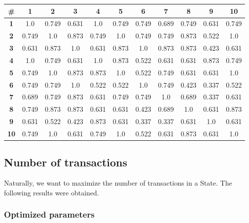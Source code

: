 \begin{table}[H]
\centering
\begin{tabular}{|c|c|c|c|c|c|c|c|c|c|c|}
    \hline
    \textbf{\#}& \textbf{1}& \textbf{2}& \textbf{3}& \textbf{4}& \textbf{5}& \textbf{6}& \textbf{7}& \textbf{8}& \textbf{9}& \textbf{10}\\ \hline
    \textbf{1}  & 1.0 & 0.749 & 0.631 & 1.0 & 0.749 & 0.749 & 0.689 & 0.749 & 0.631 & 0.749\\ \hline
    \textbf{2}  & 0.749 & 1.0 & 0.873 & 0.749 & 1.0 & 0.749 & 0.749 & 0.873 & 0.522 & 1.0\\ \hline
    \textbf{3}  & 0.631 & 0.873 & 1.0 & 0.631 & 0.873 & 1.0 & 0.873 & 0.873 & 0.423 & 0.631\\ \hline
    \textbf{4}  & 1.0 & 0.749 & 0.631 & 1.0 & 0.873 & 0.522 & 0.631 & 0.631 & 0.873 & 0.749\\ \hline
    \textbf{5}  & 0.749 & 1.0 & 0.873 & 0.873 & 1.0 & 0.522 & 0.749 & 0.631 & 0.631 & 1.0\\ \hline
    \textbf{6}  & 0.749 & 0.749 & 1.0 & 0.522 & 0.522 & 1.0 & 0.749 & 0.423 & 0.337 & 0.522\\ \hline
    \textbf{7}  & 0.689 & 0.749 & 0.873 & 0.631 & 0.749 & 0.749 & 1.0 & 0.689 & 0.337 & 0.631\\ \hline
    \textbf{8}  & 0.749 & 0.873 & 0.873 & 0.631 & 0.631 & 0.423 & 0.689 & 1.0 & 0.631 & 0.873\\ \hline
    \textbf{9}  & 0.631 & 0.522 & 0.423 & 0.873 & 0.631 & 0.337 & 0.337 & 0.631 & 1.0 & 0.631\\ \hline
    \textbf{10}  & 0.749 & 1.0 & 0.631 & 0.749 & 1.0 & 0.522 & 0.631 & 0.873 & 0.631 & 1.0\\ \hline
\end{tabular}
\end{table}

    \subsection{Number of transactions}

        Naturally, we want to maximize the number of transactions in a State. The following results were obtained.
    
        \subsubsection{Optimized parameters}
            
